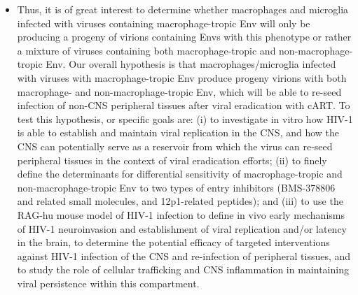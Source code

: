 \documentclass[a4paper,11pt]{article}
\makeatletter
\newenvironment{fullwidth}
    {\par
     \setlength{\@totalleftmargin}{0pt}%
     \setlength{\linewidth}{\hsize}%
     \list{}{\setlength{\leftmargin}{0pt}}
     \item\relax}
    {\endlist}
\makeatother
\begin{document}
\begin{enumerate}
\begin{itemize}
\begin{fullwidth}
Thus, it is of great interest to determine whether macrophages and microglia infected with viruses containing macrophage-tropic Env will only be producing a progeny of virions containing Envs with this phenotype or rather a mixture of viruses containing both macrophage-tropic and non-macrophage-tropic Env. 
Our overall hypothesis is that macrophages/microglia infected with viruses with macrophage-tropic Env produce progeny virions with both macrophage- and non-macrophage-tropic Env, which will be able to re-seed infection of non-CNS peripheral tissues after viral eradication with cART. 
To test this hypothesis, or specific goals are: (i) to investigate in vitro how HIV-1 is able to establish and maintain viral replication in the CNS, and how the CNS can potentially serve as a reservoir from which the virus can re-seed peripheral tissues in the context of viral eradication efforts; (ii) to finely define the determinants for differential sensitivity of macrophage-tropic and non-macrophage-tropic Env to two types of entry inhibitors (BMS-378806 and related small molecules, and 12p1-related peptides); and (iii) to use the RAG-hu mouse model of HIV-1 infection to define in vivo early mechanisms of HIV-1 neuroinvasion and establishment of viral replication and/or latency in the brain, to determine the potential efficacy of targeted interventions against HIV-1 infection of the CNS and re-infection of peripheral tissues, and to study the role of cellular trafficking and CNS inflammation in maintaining viral persistence within this compartment.
    \end{fullwidth}
  

\end{itemize}
\end{enumerate}
\end{document}
